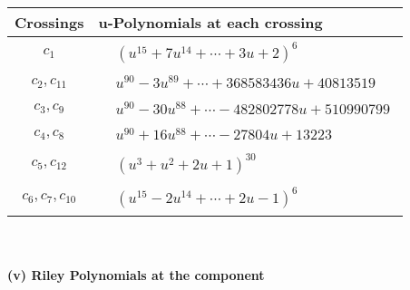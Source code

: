 \documentclass[1p]{elsarticle_modified}
\theoremstyle{definition}
\begin{document}
\begin{tabular}{m{50pt}|m{274pt}}
Crossings & \hspace{64pt}u-Polynomials at each crossing \\
\hline $$\begin{aligned}c_{1}\end{aligned}$$&$\begin{aligned}
&(u^{15}+7 u^{14}+\cdots+3 u+2)^{6}
\end{aligned}$\\
\hline $$\begin{aligned}c_{2},c_{11}\end{aligned}$$&$\begin{aligned}
&u^{90}-3 u^{89}+\cdots+368583436 u+40813519
\end{aligned}$\\
\hline $$\begin{aligned}c_{3},c_{9}\end{aligned}$$&$\begin{aligned}
&u^{90}-30 u^{88}+\cdots-482802778 u+510990799
\end{aligned}$\\
\hline $$\begin{aligned}c_{4},c_{8}\end{aligned}$$&$\begin{aligned}
&u^{90}+16 u^{88}+\cdots-27804 u+13223
\end{aligned}$\\
\hline $$\begin{aligned}c_{5},c_{12}\end{aligned}$$&$\begin{aligned}
&(u^3+u^2+2 u+1)^{30}
\end{aligned}$\\
\hline $$\begin{aligned}c_{6},c_{7},c_{10}\end{aligned}$$&$\begin{aligned}
&(u^{15}-2 u^{14}+\cdots+2 u-1)^{6}
\end{aligned}$\\
\hline
\end{tabular}\\~\\
\newpage\renewcommand{\arraystretch}{1}
\flushleft \textbf{(v) Riley Polynomials at the component}\newline \\
\end{document}
